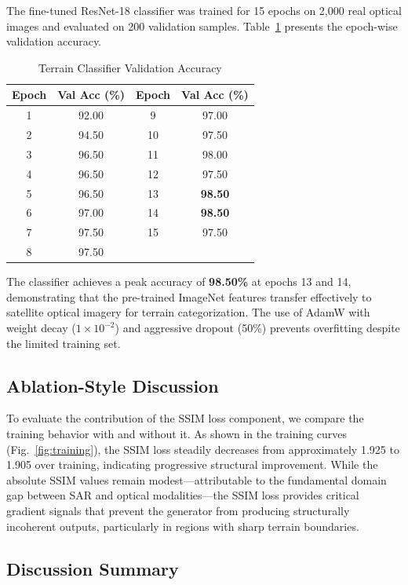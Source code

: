 \documentclass[conference]{IEEEtran}
\begin{document}
The fine-tuned ResNet-18 classifier was trained for 15 epochs on 2,000 real optical images and evaluated on 200 validation samples. Table~\ref{tab:classifier} presents the epoch-wise validation accuracy.

\begin{table}[htbp]
\caption{Terrain Classifier Validation Accuracy}
\label{tab:classifier}
\centering
\begin{tabular}{cc|cc}
\toprule
\textbf{Epoch} & \textbf{Val Acc (\%)} & \textbf{Epoch} & \textbf{Val Acc (\%)} \\
\midrule
1 & 92.00 & 9 & 97.00 \\
2 & 94.50 & 10 & 97.50 \\
3 & 96.50 & 11 & 98.00 \\
4 & 96.50 & 12 & 97.50 \\
5 & 96.50 & 13 & \textbf{98.50} \\
6 & 97.00 & 14 & \textbf{98.50} \\
7 & 97.50 & 15 & 97.50 \\
8 & 97.50 & & \\
\bottomrule
\end{tabular}
\end{table}

The classifier achieves a peak accuracy of \textbf{98.50\%} at epochs 13 and 14, demonstrating that the pre-trained ImageNet features transfer effectively to satellite optical imagery for terrain categorization. The use of AdamW with weight decay ($1 \times 10^{-2}$) and aggressive dropout (50\%) prevents overfitting despite the limited training set.

\subsection{Ablation-Style Discussion}

To evaluate the contribution of the SSIM loss component, we compare the training behavior with and without it. As shown in the training curves (Fig.~\ref{fig:training}), the SSIM loss steadily decreases from approximately 1.925 to 1.905 over training, indicating progressive structural improvement. While the absolute SSIM values remain modest---attributable to the fundamental domain gap between SAR and optical modalities---the SSIM loss provides critical gradient signals that prevent the generator from producing structurally incoherent outputs, particularly in regions with sharp terrain boundaries.

\subsection{Discussion Summary}
\end{document}
